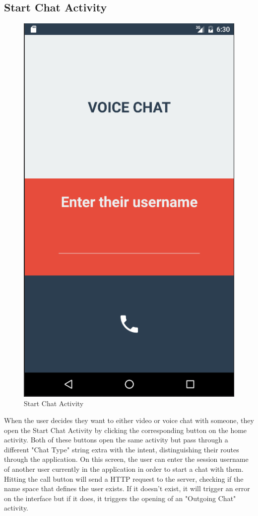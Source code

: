 \documentclass[]{report}
\begin{document}
		\subsection{Start Chat Activity}
		\begin{figure}[H]
			\caption{Start Chat Activity}
			\centering
			\includegraphics[scale=0.35]{StartChatActivity.png}
		\end{figure}
		When the user decides they want to either video or voice chat with someone, they open the Start Chat Activity by clicking the corresponding button on the home activity. Both of these buttons open the same activity but pass through a different "Chat Type" string extra with the intent, distinguishing their routes through the application. On this screen, the user can enter the session username of another user currently in the application in order to start a chat with them. Hitting the call button will send a HTTP request to the server, checking if the name space that defines the user exists. If it doesn't exist, it will trigger an error on the interface but if it does, it triggers the opening of an "Outgoing Chat" activity.
		
\end{document}
